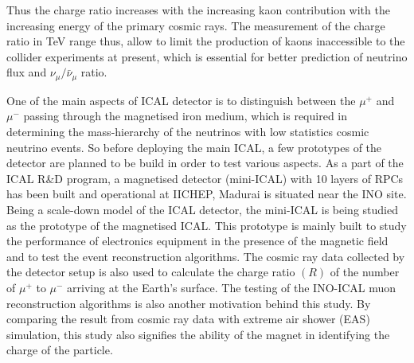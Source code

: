 Thus the charge ratio increases with the increasing kaon contribution
with the increasing energy of the primary cosmic rays.
The measurement of the charge ratio in TeV range thus, allow to limit
the production of kaons inaccessible to the collider experiments
at present, which is essential for better prediction of neutrino
flux and $\nu_{\mu}/\bar{\nu}_{\mu}$ ratio.

One of the main aspects of ICAL detector is to distinguish between
the $\mu^{+}$ and $\mu^{-}$ passing through the magnetised iron
medium, which is required in determining the mass-hierarchy of
the neutrinos with low statistics cosmic neutrino events.
So before deploying the main ICAL, a few prototypes
of the detector are planned to be build in order to test various
aspects.
As a part of the ICAL R\&D program, a magnetised detector (mini-ICAL)
with 10 layers of RPCs has been built and operational at IICHEP,
Madurai is situated near the INO site. Being a scale-down model of the
ICAL detector, the mini-ICAL is being studied as the prototype of
the magnetised ICAL. This prototype is mainly built to study the
performance of electronics equipment in the presence of the magnetic
field and to test the event reconstruction algorithms.
The cosmic ray data collected by the
detector setup is also used to calculate the charge ratio $(R)$
of the number of $\mu^{+}$ to $\mu^{-}$ arriving at the Earth's surface.
The testing of the INO-ICAL muon reconstruction algorithms is also
another motivation behind this study.
By comparing the result from cosmic ray data with extreme
air shower (EAS) simulation, this study also signifies the ability of
the magnet in identifying the charge of the particle.

